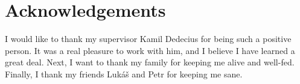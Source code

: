 \chapter*{Acknowledgements}

I would like to thank my supervisor Kamil Dedecius for being such a positive person. It was a real pleasure to work with him, and I believe I have learned a great deal. Next, I want to thank my family for keeping me alive and well-fed. Finally, I thank my friends Luk\'a\v{s} and Petr for keeping me sane.